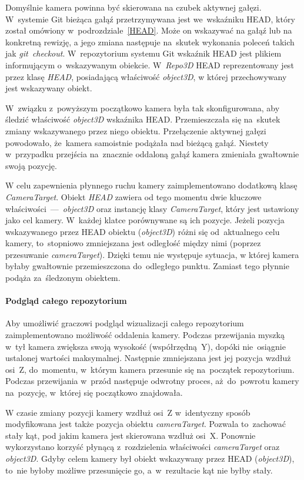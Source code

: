 \documentclass[12pt,a4paper,polish,thesis]{dcsbook}
\begin{document}
{	Domyślnie kamera powinna być skierowana na czubek aktywnej gałęzi. W~systemie Git bieżąca gałąź przetrzymywana jest we~wskaźniku HEAD, który został omówiony w~podrozdziale~\ref{HEAD}. Może on wskazywać na gałąź lub na konkretną rewizję, a jego zmiana następuje na~skutek wykonania poleceń takich jak \textit{git~checkout}. W~repozytorium systemu Git wskaźnik HEAD jest plikiem informującym o~wskazywanym obiekcie. W~\textit{Repo3D} HEAD reprezentowany jest przez klasę \textit{HEAD}, posiadającą właściwość \textit{object3D}, w której przechowywany jest wskazywany obiekt.

	W~związku z~powyższym początkowo kamera była tak skonfigurowana, aby śledzić właściwość \textit{object3D} wskaźnika HEAD. Przemieszczała się na~skutek zmiany wskazywanego przez niego obiektu. Przełączenie aktywnej gałęzi powodowało, że~kamera samoistnie podążała nad bieżącą gałąź. Niestety w~przypadku przejścia na~znacznie oddaloną gałąź kamera zmieniała gwałtownie swoją pozycję.

	W celu zapewnienia płynnego ruchu kamery zaimplementowano dodatkową klasę \textit{CameraTarget}. Obiekt \textit{HEAD} zawiera od tego momentu dwie kluczowe właściwości~---~\textit{object3D} oraz instancję klasy \textit{CameraTarget}, który jest ustawiony jako cel kamery. W~każdej klatce porównywane są ich pozycje. Jeżeli pozycja wskazywanego przez HEAD obiektu (\textit{object3D}) różni się od~aktualnego celu kamery, to~stopniowo zmniejszana jest odległość między nimi (poprzez przesuwanie \textit{cameraTarget}). Dzięki temu nie występuje sytuacja, w której kamera byłaby gwałtownie przemieszczona do~odległego punktu. Zamiast tego płynnie podąża za~śledzonym obiektem.

	\paragraph{Podgląd całego repozytorium}

	Aby umożliwić graczowi podgląd wizualizacji całego repozytorium zaimplementowano możliwość oddalenia kamery. Podczas przewijania myszką w~tył kamera zwiększa swoją wysokość (współrzędną~Y), dopóki nie~osiągnie ustalonej wartości maksymalnej. Następnie zmniejszana jest jej pozycja wzdłuż osi~Z, do~momentu, w~którym kamera przesunie się na~początek repozytorium. Podczas przewijania w~przód następuje odwrotny proces, aż~do~powrotu kamery na~pozycję, w~której się początkowo znajdowała.

	W czasie zmiany pozycji kamery wzdłuż osi~Z w~identyczny sposób modyfikowana jest także pozycja obiektu \textit{cameraTarget}. Pozwala to~zachować stały kąt, pod jakim kamera jest skierowana wzdłuż osi~X. Ponownie wykorzystano korzyść płynącą z~rozdzielenia właściwości \textit{cameraTarget} oraz \textit{object3D}. Gdyby celem kamery był obiekt wskazywany przez HEAD (\textit{object3D}), to~nie byłoby możliwe przesunięcie go, a~w~rezultacie kąt nie byłby stały.

}
\end{document}
